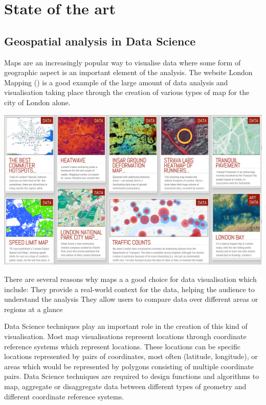 
\chapter{State of the art} %

\label{ChapterX} %


\section{Geospatial analysis in Data Science}

Maps are an increasingly popular way to visualise data where some form of geographic aspect is an important element of the analysis. The website London Mapping () is a good example of the large amount of data analysis and visualisation taking place through the creation of various types of map for the city of London alone.

\includegraphics[scale=0.5]{figures/london_mapping} %

There are several reasons why maps a a good choice for data visualisation which include:
	They provide a real-world context for the data, helping the audience to understand the analysis
	They allow users to compare data over different areas or regions at a glance

Data Science techniques play an important role in the creation of this kind of visualisation. Most map visualisations represent locations through coordinate reference systems which represent locations. These locations can be specific locations represented by pairs of coordinates, most often (latitude, longitude), or areas which would be represented by polygons consisting of multiple coordinate pairs. Data Science techniques are required to design functions and algorithms to map, aggregate or disaggregate data between different types of geometry and different coordinate reference systems. 
	
